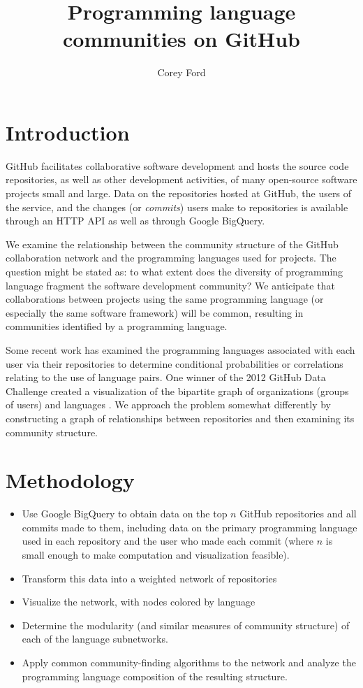 \documentclass[twocolumn]{article}
\title{Programming language communities on GitHub}
\author{Corey Ford}
\begin{document}
\maketitle

\section*{Introduction}

GitHub \cite{github} facilitates collaborative software development and hosts
the source code repositories, as well as other development activities, of many
open-source software projects small and large. Data on the repositories hosted
at GitHub, the users of the service, and the changes (or \textit{commits}) users
make to repositories is available through an HTTP API as well as through Google
BigQuery.

We examine the relationship between the community structure of the GitHub
collaboration network and the programming languages used for projects. The
question might be stated as: to what extent does the diversity of programming
language fragment the software development community? We anticipate that
collaborations between projects using the same programming language (or
especially the same software framework) will be common, resulting in communities
identified by a programming language.

Some recent work has examined the programming languages associated with each
user via their repositories to determine conditional probabilities \cite{doll12}
or correlations \cite{shah13} relating to the use of language pairs. One winner
of the 2012 GitHub Data Challenge created a visualization of the bipartite graph
of organizations (groups of users) and languages \cite{rodrigues12}. We approach
the problem somewhat differently by constructing a graph of relationships
between repositories and then examining its community structure.

\section*{Methodology}
\begin{itemize}
    \item Use Google BigQuery to obtain data on the top $n$ GitHub repositories
        and all commits made to them, including data on the primary programming
        language used in each repository and the user who made each commit
        (where $n$ is small enough to make computation and visualization
        feasible).
    \item Transform this data into a weighted network of repositories
    \item Visualize the network, with nodes colored by language
    \item Determine the modularity (and similar measures of community structure)
        of each of the language subnetworks.
    \item Apply common community-finding algorithms to the network and analyze
        the programming language composition of the resulting structure.
\end{itemize}
\end{document}
